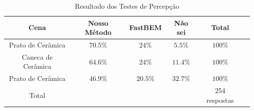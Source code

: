 \begin{table}[ht]
\begin{center}
\begin{tabular}{c|ccccc}
Cena & Nosso Método & FastBEM & Não sei & Total\\
\hline Prato de Cerâmica & $70.5\%$ & $24\%$ & $5.5\%$ & $100\%$\\
Caneca de Cerâmica & $64.6\%$ & $24\%$ & $11.4\%$ & $100\%$\\
Prato de Cerâmica & $46.9\%$ & $20.5\%$ & $32.7\%$ & $100\%$\\
Total & & & & 254 respostas
\end{tabular}
\end{center}
\caption{Resultado dos Testes de Percepção}\label{tab:survey_results}
\end{table}




